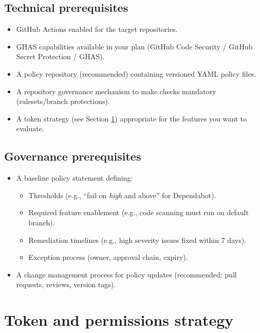 \documentclass[11pt]{article}
\begin{document}
\subsection{Technical prerequisites}

\begin{itemize}[leftmargin=*]
  \item GitHub Actions enabled for the target repositories.
  \item GHAS capabilities available in your plan (GitHub Code Security / GitHub Secret Protection / GHAS).
  \item A policy repository (recommended) containing versioned YAML policy files.
  \item A repository governance mechanism to make checks mandatory (rulesets/branch protections).
  \item A token strategy (see Section \ref{sec:token-strategy}) appropriate for the features you want to evaluate.
\end{itemize}

\subsection{Governance prerequisites}

\begin{itemize}[leftmargin=*]
  \item A baseline policy statement defining:
    \begin{itemize}
      \item Thresholds (e.g., ``fail on \textit{high} and above'' for Dependabot).
      \item Required feature enablement (e.g., code scanning must run on default branch).
      \item Remediation timelines (e.g., high severity issues fixed within 7 days).
      \item Exception process (owner, approval chain, expiry).
    \end{itemize}
  \item A change management process for policy updates (recommended: pull requests, reviews, version tags).
\end{itemize}

\section{Token and permissions strategy}
\label{sec:token-strategy}
\end{document}
